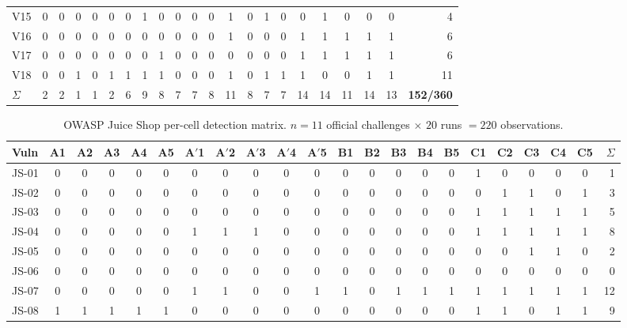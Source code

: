 \documentclass[conference]{IEEEtran}
\begin{document}
\begin{table}[t]
\begin{tabular}{l|ccccc|ccccc|ccccc|ccccc|r}
V15 & 0 & 0 & 0 & 0 & 0 & 0 & 1 & 0 & 0 & 0 & 0 & 1 & 0 & 1 & 0 & 0 & 1 & 0 & 0 & 0 &  4 \\
V16 & 0 & 0 & 0 & 0 & 0 & 0 & 0 & 0 & 0 & 0 & 0 & 1 & 0 & 0 & 0 & 1 & 1 & 1 & 1 & 1 &  6 \\
V17 & 0 & 0 & 0 & 0 & 0 & 0 & 0 & 1 & 0 & 0 & 0 & 0 & 0 & 0 & 0 & 1 & 1 & 1 & 1 & 1 &  6 \\
V18 & 0 & 0 & 1 & 0 & 1 & 1 & 1 & 1 & 0 & 0 & 0 & 1 & 0 & 1 & 1 & 1 & 0 & 0 & 1 & 1 & 11 \\
\midrule
\textbf{$\Sigma$} & 2 & 2 & 1 & 1 & 2 & 6 & 9 & 8 & 7 & 7 & 8 & 11 & 8 & 7 & 7 & 14 & 14 & 11 & 14 & 13 & \textbf{152/360} \\
\bottomrule
\end{tabular}
\end{table}

\begin{table}[t]
\centering
\caption{OWASP Juice Shop per-cell detection matrix. $n = 11$ official challenges $\times$ $20$ runs $= 220$ observations.}
\label{tab:js-matrix}
\scriptsize
\setlength{\tabcolsep}{3pt}
\begin{tabular}{l|ccccc|ccccc|ccccc|ccccc|r}
\toprule
\textbf{Vuln} & \textbf{A1} & \textbf{A2} & \textbf{A3} & \textbf{A4} & \textbf{A5} & \textbf{A$'$1} & \textbf{A$'$2} & \textbf{A$'$3} & \textbf{A$'$4} & \textbf{A$'$5} & \textbf{B1} & \textbf{B2} & \textbf{B3} & \textbf{B4} & \textbf{B5} & \textbf{C1} & \textbf{C2} & \textbf{C3} & \textbf{C4} & \textbf{C5} & \textbf{$\Sigma$} \\
\midrule
JS-01 & 0 & 0 & 0 & 0 & 0 & 0 & 0 & 0 & 0 & 0 & 0 & 0 & 0 & 0 & 0 & 1 & 0 & 0 & 0 & 0 &  1 \\
JS-02 & 0 & 0 & 0 & 0 & 0 & 0 & 0 & 0 & 0 & 0 & 0 & 0 & 0 & 0 & 0 & 0 & 1 & 1 & 0 & 1 &  3 \\
JS-03 & 0 & 0 & 0 & 0 & 0 & 0 & 0 & 0 & 0 & 0 & 0 & 0 & 0 & 0 & 0 & 1 & 1 & 1 & 1 & 1 &  5 \\
JS-04 & 0 & 0 & 0 & 0 & 0 & 1 & 1 & 1 & 0 & 0 & 0 & 0 & 0 & 0 & 0 & 1 & 1 & 1 & 1 & 1 &  8 \\
JS-05 & 0 & 0 & 0 & 0 & 0 & 0 & 0 & 0 & 0 & 0 & 0 & 0 & 0 & 0 & 0 & 0 & 0 & 1 & 1 & 0 &  2 \\
JS-06 & 0 & 0 & 0 & 0 & 0 & 0 & 0 & 0 & 0 & 0 & 0 & 0 & 0 & 0 & 0 & 0 & 0 & 0 & 0 & 0 &  0 \\
JS-07 & 0 & 0 & 0 & 0 & 0 & 1 & 1 & 0 & 0 & 1 & 1 & 0 & 1 & 1 & 1 & 1 & 1 & 1 & 1 & 1 & 12 \\
JS-08 & 1 & 1 & 1 & 1 & 1 & 0 & 0 & 0 & 0 & 0 & 0 & 0 & 0 & 0 & 0 & 1 & 1 & 0 & 1 & 1 &  9 \\

\end{tabular}
\end{table}
\end{document}
